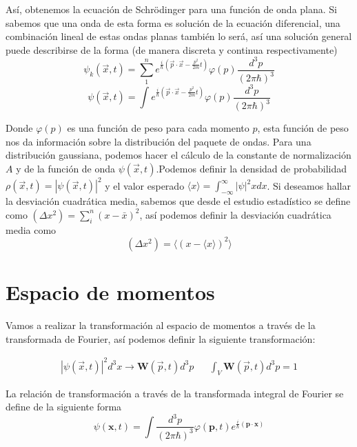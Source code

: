 \documentclass{report}
\begin{document}
Así, obtenemos la ecuación de Schrödinger para una función de onda plana. Si sabemos que una onda de esta forma es solución de la ecuación diferencial, una combinación lineal de estas ondas planas también lo será, así una solución general puede describirse de la forma (de manera discreta y continua respectivamente)
    $$\psi_k(\vec{x},t)=\sum_{1}^{n}e^{\frac{i}{\hbar}\left(\vec{p}\cdot\vec{x}-\frac{p^2}{2m}t\right)}\varphi(p)\frac{d^3 p}{(2 \pi \hbar)^3}$$
\begin{equation}\label{Superposition}
    \psi(\vec{x},t)=\int e^{\frac{i}{\hbar}\left(\vec{p}\cdot\vec{x}-\frac{p^2}{2m}t\right)}\varphi(p)\frac{d^3 p}{(2 \pi \hbar)^3}
\end{equation}

Donde $\varphi(p)$ es una función de peso para cada momento $p$, esta función de peso nos da información sobre la distribución del paquete de ondas. Para una distribución gaussiana, podemos hacer el cálculo de la constante de normalización $A$ y de la función de onda $\psi(\vec{x},t)$.Podemos definir la densidad de probabilidad $\rho(\vec{x},t)=\left\vert \psi(\vec{x},t) \right\vert^2 $ y el valor esperado $\langle x\rangle=\int_{-\infty}^{\infty}\left\vert \psi \right\vert^2 x dx$. Si deseamos hallar la desviación cuadrática media, sabemos que desde el estudio estadístico se define como $\left(\Delta x^2\right)=\sum_{i}^{n} \left(x-\bar{x}\right)^2$, así podemos definir la desviación cuadrática media como
 \begin{equation}
    \left( \Delta x^2\right)=\langle(x-\langle x\rangle)^2 \rangle
 \end{equation}
\section{Espacio de momentos}

Vamos a realizar la transformación al espacio de momentos a través de la transformada de Fourier, así podemos definir la siguiente transformación:

\begin{align*}
    \left\vert \psi (\vec{x},t)\right\vert^2 d^3x \longrightarrow \mathbf{W} (\vec{p},t)d^3p && \int_{V} \mathbf{W}(\vec{p},t)d^3p=1
\end{align*}

La relación de transformación a través de la transformada integral de Fourier se define de la siguiente forma
\begin{equation}\label{TFourier}
    \psi(\textbf{x},t)=\int\frac{d^3p}{(2\pi\hbar)^3}\varphi(\textbf{p},t)e^{\frac{i}{\hbar}(\textbf{p}\cdot\textbf{x})}
\end{equation}
\end{document}
